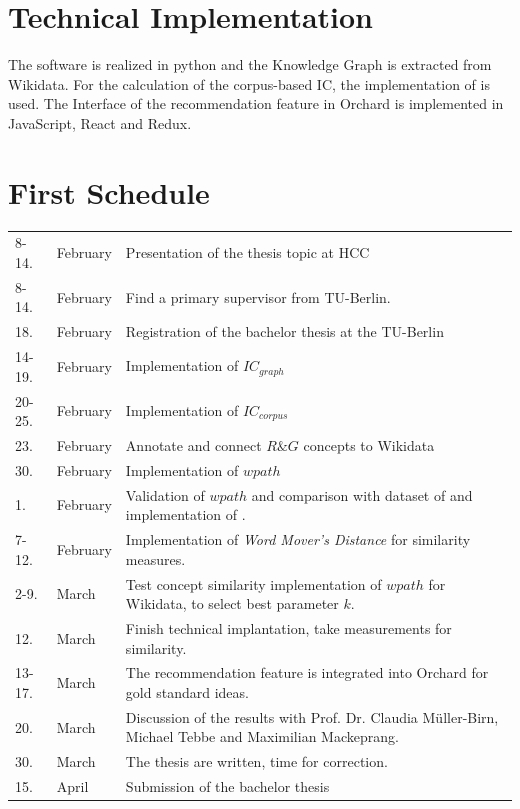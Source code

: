 \documentclass[pdftex,a4paper,12pt]{scrartcl}
\theoremstyle{definition}
\begin{document}
    

\section{Technical Implementation}
    
    The software is realized in python and the Knowledge Graph is extracted from Wikidata.
    For the calculation of the corpus-based IC, the implementation of \citet{zhu_computing_2017} is used. 
    The Interface of the recommendation feature in Orchard is implemented in JavaScript, React and Redux.  
    

\section{First Schedule}
\renewcommand{\arraystretch}{1.5}
\begin{tabularx}{\textwidth}{llX}

8-14.& February & Presentation of the thesis topic at HCC\\
8-14.& February & Find a primary supervisor from TU-Berlin.\\
18. & February & Registration of the bachelor thesis at the TU-Berlin \\
14-19.& February & Implementation of $IC_{graph}$\\
20-25.& February & Implementation of $IC_{corpus}$\\
23.& February & Annotate and connect $R\&G$ concepts to Wikidata\\
30.& February & Implementation of $wpath$\\
1.& February & Validation of $wpath$ and comparison with dataset of \citet{rubenstein_contextual_1965} and implementation of \citet{zhu_computing_2017}.\\
7-12.& February & Implementation of \textit{Word Mover's Distance} for similarity measures. \\
2-9.& March & Test concept similarity implementation of $wpath$ for Wikidata, to select best parameter $k$. \\
12.& March & Finish technical implantation, take measurements for similarity.\\
13-17.& March & The recommendation feature is integrated into Orchard for gold standard ideas. \\
20.& March & Discussion of the results with Prof. Dr. Claudia Müller-Birn, Michael Tebbe and Maximilian Mackeprang.\\
30.& March & The thesis are written, time for correction.\\
15.& April & Submission of the bachelor thesis\\
\end{tabularx}
\end{document}
